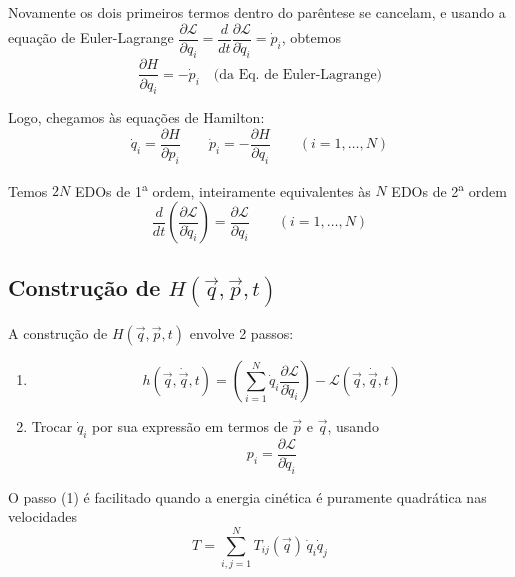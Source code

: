 Novamente os dois primeiros termos dentro do parêntese se cancelam, e usando a equação de Euler-Lagrange $\dfrac{\partial \mathcal{L}}{\partial q_i} = \dfrac{d}{dt}\dfrac{\partial \mathcal{L}}{\partial \dot{q}_i} = \dot{p}_i$, obtemos
\begin{equation}
    \frac{\partial H}{\partial q_i} = -\dot{p}_i \quad \text{(da Eq. de Euler-Lagrange)}
\label{eq:aula9_dHdq_final}
\end{equation}

Logo, chegamos às equações de Hamilton:
\begin{equation}
    \boxed{\dot{q}_i = \frac{\partial H}{\partial p_i}} \qquad \boxed{\dot{p}_i = -\frac{\partial H}{\partial q_i}} \qquad (i = 1, \dots, N)
\label{eq:aula9_eqs_hamilton}
\end{equation}

Temos $2N$ EDOs de 1\textsuperscript{a} ordem, inteiramente equivalentes às $N$ EDOs de 2\textsuperscript{a} ordem
\begin{equation}
    \frac{d}{dt}\left( \frac{\partial \mathcal{L}}{\partial \dot{q}_i} \right) = \frac{\partial \mathcal{L}}{\partial q_i} \qquad (i = 1, \dots, N)
\label{eq:aula9_euler_lagrange}
\end{equation}

\subsection*{Construção de $H(\vec{q}, \vec{p}, t)$}

A construção de $H(\vec{q}, \vec{p}, t)$ envolve 2 passos:

\begin{enumerate}
    \item
    \begin{equation}
        h(\vec{q}, \dot{\vec{q}}, t) = \left( \sum_{i=1}^{N} \dot{q}_i \frac{\partial \mathcal{L}}{\partial \dot{q}_i} \right) - \mathcal{L}(\vec{q}, \dot{\vec{q}}, t)
    \label{eq:aula9_passo1}
    \end{equation}
    \item Trocar $\dot{q}_i$ por sua expressão em termos de $\vec{p}$ e $\vec{q}$, usando
    \begin{equation}
        p_i = \frac{\partial \mathcal{L}}{\partial \dot{q}_i}
    \label{eq:aula9_passo2}
    \end{equation}
\end{enumerate}

O passo (1) é facilitado quando a energia cinética é puramente quadrática nas velocidades
\begin{equation}
    T = \sum_{i,j=1}^{N} T_{ij}(\vec{q}) \, \dot{q}_i \dot{q}_j
\label{eq:aula9_T_quad}
\end{equation}

